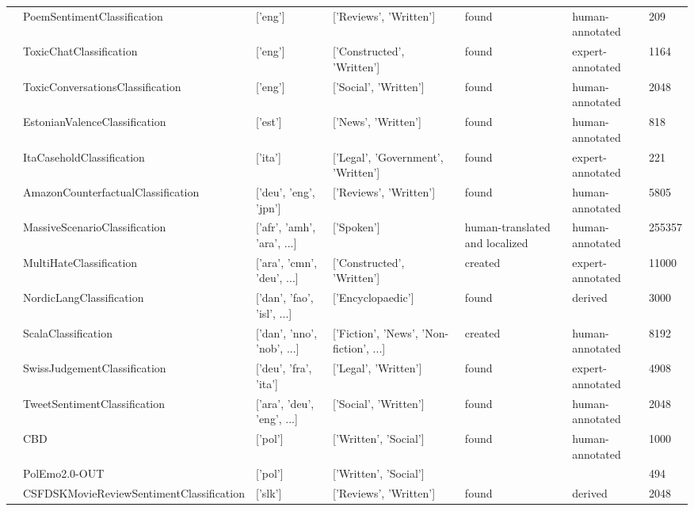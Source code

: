 \begin{table*}
{\begin{tabular}{lllllll}
     & PoemSentimentClassification \cite{sheng2020investigating} & ['eng'] & ['Reviews', 'Written'] & found & human-annotated & 209 \\
     & ToxicChatClassification \cite{lin2023toxicchat} & ['eng'] & ['Constructed', 'Written'] & found & expert-annotated & 1164 \\
     & ToxicConversationsClassification \cite{jigsaw-unintended-bias-in-toxicity-classification} & ['eng'] & ['Social', 'Written'] & found & human-annotated & 2048 \\
     & EstonianValenceClassification \cite{Pajupuu2023} & ['est'] & ['News', 'Written'] & found & human-annotated & 818 \\
     & ItaCaseholdClassification \cite{10.1145/3594536.3595177} & ['ita'] & ['Legal', 'Government', 'Written'] & found & expert-annotated & 221 \\
     & AmazonCounterfactualClassification \cite{oneill-etal-2021-wish} & ['deu', 'eng', 'jpn'] & ['Reviews', 'Written'] & found & human-annotated & 5805 \\
     & MassiveScenarioClassification \cite{fitzgerald2022massive} & ['afr', 'amh', 'ara', ...] & ['Spoken'] & human-translated and localized & human-annotated & 255357 \\
     & MultiHateClassification \cite{rottger-etal-2021-hatecheck} & ['ara', 'cmn', 'deu', ...] & ['Constructed', 'Written'] & created & expert-annotated & 11000 \\
     & NordicLangClassification \cite{haas-derczynski-2021-discriminating} & ['dan', 'fao', 'isl', ...] & ['Encyclopaedic'] & found & derived & 3000 \\
     & ScalaClassification \cite{nielsen-2023-scandeval} & ['dan', 'nno', 'nob', ...] & ['Fiction', 'News', 'Non-fiction', ...] & created & human-annotated & 8192 \\
     & SwissJudgementClassification \cite{niklaus2022empirical} & ['deu', 'fra', 'ita'] & ['Legal', 'Written'] & found & expert-annotated & 4908 \\
     & TweetSentimentClassification \cite{barbieri-etal-2022-xlm} & ['ara', 'deu', 'eng', ...] & ['Social', 'Written'] & found & human-annotated & 2048 \\
     & CBD \cite{ogr:kob:19:poleval} & ['pol'] & ['Written', 'Social'] & found & human-annotated & 1000 \\
     & PolEmo2.0-OUT  & ['pol'] & ['Written', 'Social'] & & & 494 \\
     & CSFDSKMovieReviewSentimentClassification \cite{stefanik2023resources} & ['slk'] & ['Reviews', 'Written'] & found & derived & 2048 \\

\end{tabular}}
\end{table*}

